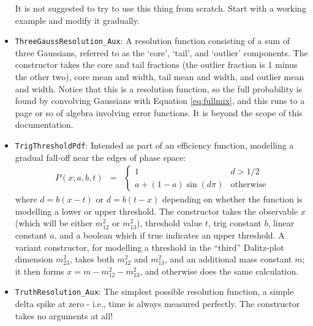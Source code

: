 \documentclass[12pt,pdflatex]{article}
\begin{document}
\begin{itemize}
It is not suggested to try to use this thing from scratch. Start with a working
example and modify it gradually. 
\item \texttt{ThreeGaussResolution\_Aux}: A resolution function
consisting of a sum of three Gaussians, referred to as the `core', 
`tail', and `outlier' components. The constructor takes the core and
tail fractions (the outlier fraction is 1 minus the other two), core
mean and width, tail mean and width, and outlier mean and width. Notice
that this is a resolution function, so the full probability is found by
convolving Gaussians with Equation \ref{eq:fullmix}, and this runs to a page
or so of algebra involving error functions. It is beyond the scope of this
documentation. 
\item \texttt{TrigThresholdPdf}: Intended as part of an efficiency
function, modelling a gradual fall-off near the edges of phase space:
\begin{eqnarray}
P(x;a,b,t) &=& \left\{\begin{matrix}
1 & d > 1/2 \\
a + (1-a) \sin(d\pi) & \mathrm{otherwise}
\end{matrix}
\right. 
\end{eqnarray}
where $d=b(x-t)$ or $d=b(t-x)$ depending on whether the function is modelling
a lower or upper threshold. The constructor takes the observable $x$ 
(which will be either $m^2_{12}$ or $m^2_{13}$), 
threshold value $t$, trig constant $b$, linear constant $a$, and a boolean
which if true indicates an upper threshold. A variant
constructor, for modelling a threshold in the ``third'' Dalitz-plot dimension
$m^2_{23}$, takes both $m^2_{12}$ and $m^2_{13}$, and an additional mass constant $m$;
it then forms $x = m - m^2_{12} - m^2_{13}$, and otherwise does the same calculation. 
\item \texttt{TruthResolution\_Aux}: The simplest possible resolution
function, a simple delta spike at zero - i.e., time is always measured
perfectly. The constructor takes no arguments at all! 
\end{itemize}
\end{document}
